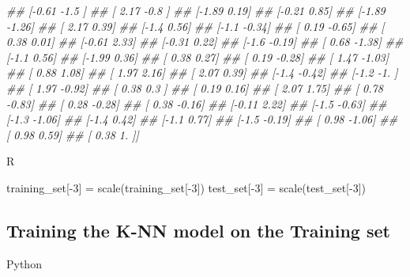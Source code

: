 \documentclass[
]{book}
\newenvironment{Shaded}{\begin{snugshade}}{\end{snugshade}}
\newcommand{\CommentTok}[1]{\textcolor[rgb]{0.56,0.35,0.01}{\textit{#1}}}
\newcommand{\DecValTok}[1]{\textcolor[rgb]{0.00,0.00,0.81}{#1}}
\newcommand{\FunctionTok}[1]{\textcolor[rgb]{0.00,0.00,0.00}{#1}}
\newcommand{\NormalTok}[1]{#1}
\newcommand{\OtherTok}[1]{\textcolor[rgb]{0.56,0.35,0.01}{#1}}
\newcommand{\SpecialCharTok}[1]{\textcolor[rgb]{0.00,0.00,0.00}{#1}}
\theoremstyle{definition}
\theoremstyle{definition}
\theoremstyle{definition}
\theoremstyle{definition}
\theoremstyle{remark}
\begin{document}
\begin{Shaded}
\begin{Highlighting}[]
\CommentTok{\#\#  [{-}0.61 {-}1.5 ]}
\CommentTok{\#\#  [ 2.17 {-}0.8 ]}
\CommentTok{\#\#  [{-}1.89  0.19]}
\CommentTok{\#\#  [{-}0.21  0.85]}
\CommentTok{\#\#  [{-}1.89 {-}1.26]}
\CommentTok{\#\#  [ 2.17  0.39]}
\CommentTok{\#\#  [{-}1.4   0.56]}
\CommentTok{\#\#  [{-}1.1  {-}0.34]}
\CommentTok{\#\#  [ 0.19 {-}0.65]}
\CommentTok{\#\#  [ 0.38  0.01]}
\CommentTok{\#\#  [{-}0.61  2.33]}
\CommentTok{\#\#  [{-}0.31  0.22]}
\CommentTok{\#\#  [{-}1.6  {-}0.19]}
\CommentTok{\#\#  [ 0.68 {-}1.38]}
\CommentTok{\#\#  [{-}1.1   0.56]}
\CommentTok{\#\#  [{-}1.99  0.36]}
\CommentTok{\#\#  [ 0.38  0.27]}
\CommentTok{\#\#  [ 0.19 {-}0.28]}
\CommentTok{\#\#  [ 1.47 {-}1.03]}
\CommentTok{\#\#  [ 0.88  1.08]}
\CommentTok{\#\#  [ 1.97  2.16]}
\CommentTok{\#\#  [ 2.07  0.39]}
\CommentTok{\#\#  [{-}1.4  {-}0.42]}
\CommentTok{\#\#  [{-}1.2  {-}1.  ]}
\CommentTok{\#\#  [ 1.97 {-}0.92]}
\CommentTok{\#\#  [ 0.38  0.3 ]}
\CommentTok{\#\#  [ 0.19  0.16]}
\CommentTok{\#\#  [ 2.07  1.75]}
\CommentTok{\#\#  [ 0.78 {-}0.83]}
\CommentTok{\#\#  [ 0.28 {-}0.28]}
\CommentTok{\#\#  [ 0.38 {-}0.16]}
\CommentTok{\#\#  [{-}0.11  2.22]}
\CommentTok{\#\#  [{-}1.5  {-}0.63]}
\CommentTok{\#\#  [{-}1.3  {-}1.06]}
\CommentTok{\#\#  [{-}1.4   0.42]}
\CommentTok{\#\#  [{-}1.1   0.77]}
\CommentTok{\#\#  [{-}1.5  {-}0.19]}
\CommentTok{\#\#  [ 0.98 {-}1.06]}
\CommentTok{\#\#  [ 0.98  0.59]}
\CommentTok{\#\#  [ 0.38  1.  ]]}
\end{Highlighting}
\end{Shaded}

R

\begin{Shaded}
\begin{Highlighting}[]
\NormalTok{training\_set[}\SpecialCharTok{{-}}\DecValTok{3}\NormalTok{] }\OtherTok{=} \FunctionTok{scale}\NormalTok{(training\_set[}\SpecialCharTok{{-}}\DecValTok{3}\NormalTok{])}
\NormalTok{test\_set[}\SpecialCharTok{{-}}\DecValTok{3}\NormalTok{] }\OtherTok{=} \FunctionTok{scale}\NormalTok{(test\_set[}\SpecialCharTok{{-}}\DecValTok{3}\NormalTok{])}
\end{Highlighting}
\end{Shaded}

\hypertarget{training-the-k-nn-model-on-the-training-set}{%
\subsection{Training the K-NN model on the Training set}\label{training-the-k-nn-model-on-the-training-set}}

Python
\end{document}
